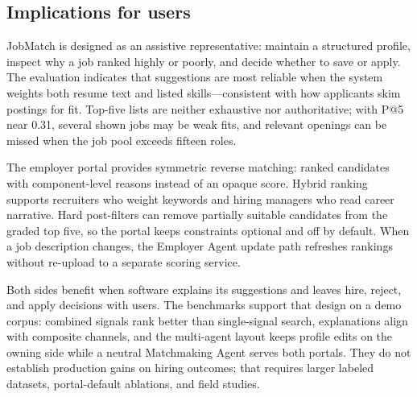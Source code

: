 \subsection{Implications for users}\label{sec:6-implications}

JobMatch is designed as an assistive representative: maintain a structured profile, inspect why a job ranked highly or poorly, and decide whether to save or apply.
The evaluation indicates that suggestions are most reliable when the system weights both resume text and listed skills---consistent with how applicants skim postings for fit.
Top-five lists are neither exhaustive nor authoritative; with P@5 near 0.31, several shown jobs may be weak fits, and relevant openings can be missed when the job pool exceeds fifteen roles.

The employer portal provides symmetric reverse matching: ranked candidates with component-level reasons instead of an opaque score.
Hybrid ranking supports recruiters who weight keywords and hiring managers who read career narrative.
Hard post-filters can remove partially suitable candidates from the graded top five, so the portal keeps constraints optional and off by default.
When a job description changes, the Employer Agent update path refreshes rankings without re-upload to a separate scoring service.

Both sides benefit when software explains its suggestions and leaves hire, reject, and apply decisions with users.
The benchmarks support that design on a demo corpus: combined signals rank better than single-signal search, explanations align with composite channels, and the multi-agent layout keeps profile edits on the owning side while a neutral Matchmaking Agent serves both portals.
They do not establish production gains on hiring outcomes; that requires larger labeled datasets, portal-default ablations, and field studies.
